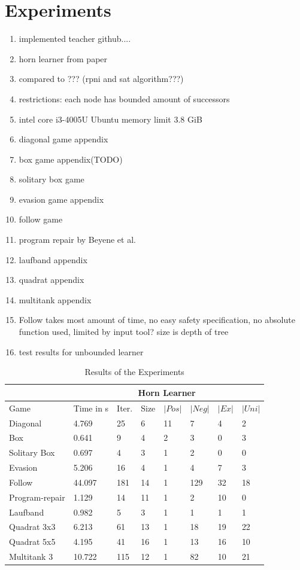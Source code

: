 \documentclass[10pt,a4paper]{article}
\theoremstyle{plain}
\theoremstyle{definition}
\begin{document}
\section{Experiments}
\begin{enumerate}
\item implemented teacher github....
\item horn learner from paper 
\item compared to ??? (rpni and sat algorithm???)
\item restrictions: each node has bounded amount of successors
\item intel core i3-4005U Ubuntu  memory limit 3.8 GiB
\item diagonal game appendix
\item box game appendix(TODO)
\item solitary box game
\item evasion game appendix
\item follow game 
\item program repair by Beyene et al.
\item laufband appendix
\item quadrat appendix
\item multitank appendix
\item Follow takes most amount of time, no easy safety specification, no absolute function used, limited by input tool? size is depth of tree
\item test results for unbounded learner
\end{enumerate}
\begin{table}[h]
 \caption{Results of the Experiments}
\begin{tabularx}{\textwidth}{p{}p{} p{} p{}p{} p{} p{} p{}}
\hline
& \multicolumn{7}{c}{Horn Learner}\\ \hline
Game & Time in s & Iter.& Size & $|Pos|$ & $|Neg|$ & $|Ex|$ & $|Uni|$ \\ \hline
Diagonal & 4.769 & 25 & 6 & 11 & 7 & 4 & 2 \\ 
Box & 0.641 & 9 & 4 & 2 & 3 & 0 & 3 \\
Solitary Box & 0.697 & 4 & 3 & 1 & 2 & 0 & 0 \\
Evasion & 5.206 & 16 & 4 & 1 & 4 & 7 & 3 \\ 
Follow & 44.097 & 181 & 14 & 1 & 129 & 32 & 18 \\ 
Program-repair & 1.129 & 14 & 11 & 1 & 2 & 10 & 0 \\
Laufband & 0.982 & 5 & 3 & 1 & 1 & 1 & 1 \\ 
Quadrat 3x3 & 6.213 & 61 & 13 & 1 & 18 & 19 & 22 \\
Quadrat 5x5 & 4.195 & 41 & 16 & 1 & 13 & 16 & 10 \\
Multitank 3 & 10.722 & 115& 12 & 1 & 82 & 10 & 21 \\

\end{tabularx}
 \label{tab:TESTS} 
\end{table}
\newpage
\end{document}
